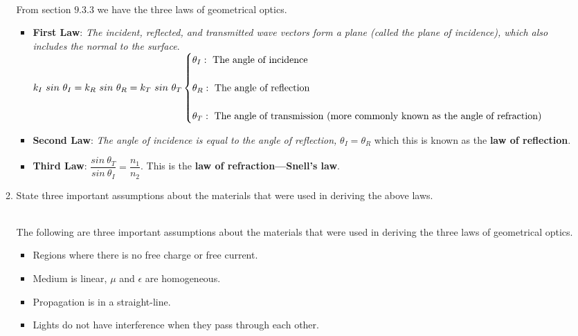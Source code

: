 \documentclass[fleqn]{article}
\begin{document}
\begin{enumerate}
\begin{enumerate}
        \textcolor{hwColor}{
          \\
          From section $9.3.3$ we have the three laws of geometrical optics.
          \\
          \begin{itemize}
            \item \textbf{First Law}: \emph{The incident, reflected, and transmitted wave vectors
            form a plane (called the plane of incidence), which also includes the
            normal to the surface}. 
            \\
            $
              k_I ~ sin ~ \theta_I=k_R ~ sin ~ \theta_R=k_T ~ sin ~ \theta_T
              \\
              \\
              \begin{cases}
                \theta_I: ~ \text{The angle of incidence}
                \\
                \\
                \theta_R: ~ \text{The angle of reflection} 
                \\
                \\
                \theta_T: ~ \text{The angle of transmission (more commonly known as the angle of refraction)} 
              \end{cases}
            $
            \\
            \item \textbf{Second Law}: \emph{The angle of incidence is equal to the angle of
            reflection,} $\theta_I=\theta_R$ which this is known as the \textbf{law of reflection}.
            \item \textbf{Third Law}: $\dfrac{sin ~ \theta_T}{sin ~ \theta_I}=\dfrac{n_1}{n_2}$. This is the \textbf{law of refraction—Snell’s law}.
          \end{itemize}
        }


      \item State three important assumptions about the materials that were used in deriving the above laws.

        \textcolor{hwColor}{
          \\
          The following are three important assumptions about the materials that were used in deriving the three laws of geometrical optics.
          \\
          \begin{itemize}
            \item Regions where there is no free charge or free current.
            \item Medium is linear, $\mu$ and $\epsilon$ are homogeneous.
            \item Propagation is in a straight-line.
            \item Lights do not have interference when they pass through each other.
          \end{itemize}
        }



\end{enumerate}
\end{enumerate}
\end{document}
